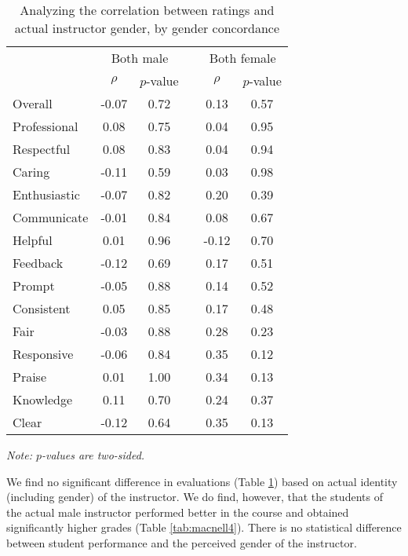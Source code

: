 \documentclass[12pt]{article}
\newcommand{\todo}[1]{{\color{red}{TO DO: \sc #1}}}
\begin{document}
\begin{table}[htbp]
  \centering
  \footnotesize 
  \caption{Analyzing the correlation between ratings and actual instructor gender, by gender concordance}
    \begin{tabular}{lccccc}
    \toprule 
          & \multicolumn{2}{c}{Both male}  &  & \multicolumn{2}{c}{Both female} \\
                          & $\rho$  &  $p$-value &  & $\rho$  &  $p$-value    \\
                          
   \midrule
    Overall &                -0.07       & 0.72 & &  0.13    & 0.57   \\
    Professional &            0.08       & 0.75 & &  0.04    & 0.95   \\
    Respectful		       &  0.08       & 0.83 & &  0.04    & 0.94   \\
    Caring &                 -0.11       & 0.59 & &  0.03    & 0.98  \\
    Enthusiastic   &         -0.07       & 0.82 & &  0.20    & 0.39   \\
    Communicate        &     -0.01       & 0.84 & &  0.08    & 0.67  \\
    Helpful   &               0.01       & 0.96 & & -0.12    & 0.70   \\
    Feedback   &             -0.12       & 0.69 & &  0.17    & 0.51   \\
    Prompt    &              -0.05       & 0.88 & &  0.14    & 0.52   \\
    Consistent   &            0.05       & 0.85 & &  0.17    & 0.48   \\
    Fair   &                 -0.03       & 0.88 & &  0.28    & 0.23  \\
    Responsive   &           -0.06       & 0.84 & &  0.35    & 0.12  \\
    Praise   &                0.01       & 1.00 & &  0.34    & 0.13  \\
    Knowledge   &             0.11       & 0.70 & &  0.24    & 0.37  \\
    Clear   &                -0.12       & 0.64 & &  0.35    & 0.13  \\
    \bottomrule
    \end{tabular}%
 \label{tab:macnell3}%

  \textit{Note: $p$-values are two-sided.}  
\end{table}%
\normalsize

We find no significant difference in evaluations (Table \ref{tab:macnell3}) based on actual identity (including
gender) of
the instructor. \todo{didn't we?  -- yes, but here we're looking at the concordance of actual instructor gender and student gender (KO)}
We do find, however, that the students of the actual male instructor performed better in the course and obtained significantly higher grades (Table \ref{tab:macnell4}). There is no statistical difference between student performance and the perceived gender of the instructor. 
\end{document}
